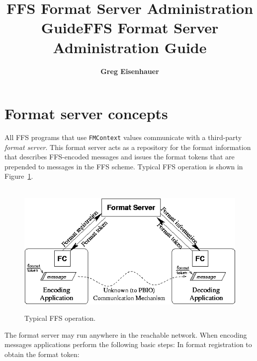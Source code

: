 \documentclass{article}
\title{FFS Format Server Administration Guide}
\author{ {\large\bf Greg Eisenhauer }\\
}
\begin{document}

\title{FFS Format Server Administration Guide}
\renewcommand{\thepage}{}
\maketitle
\section{Format server concepts}
All FFS programs that use {\tt FMContext} values communicate with a
third-party {\it format server}.  This format server acts as a repository
for the format information that describes FFS-encoded messages and issues
the format tokens that are prepended to messages in the FFS scheme.  Typical
FFS operation is shown in Figure~\ref{fig:server}.
\begin{figure}[tb]
\begin{center}\
\includegraphics[width=6.3in]{server.png}
\caption{Typical FFS operation.\label{fig:server}}
\end{center}
\end{figure}
The format server may run anywhere in the reachable network.  When encoding
messages applications perform the following basic steps:
In format registration to obtain the format token:
\end{document}
